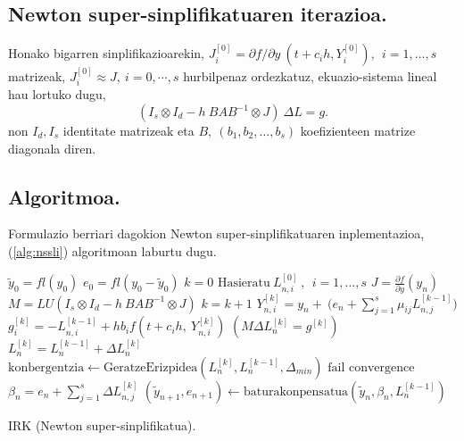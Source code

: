 \subsection*{Newton super-sinplifikatuaren iterazioa.}

Honako bigarren sinplifikazioarekin, $J_i^{[0]}=\partial f / \partial y \ (t+c_ih, Y_i^{[0]}), \ \  i=1,\dots,s$ matrizeak,  $J_i^{[0]} \approx J, \ i=0,\cdots,s$ hurbilpenaz ordezkatuz, ekuazio-sistema lineal hau lortuko dugu,
\begin{equation}
\label{eq:nsseq2}
(I_s \otimes I_d - h \ BAB^{-1} \otimes J) \ \Delta L = g. 
\end{equation}
non $I_d, I_s$ identitate matrizeak eta $B, \ (b_1,b_2,\dots,b_s)$ koefizienteen matrize diagonala diren.  

\subsection*{Algoritmoa.}

Formulazio berriari dagokion Newton super-sinplifikatuaren inplementazioa, (\ref{alg:nssli}) algoritmoan laburtu dugu.

\begin{algorithm}[H]
 \BlankLine
  $\tilde{y}_0=fl(y_0)$\;
  $e_0=fl(y_0-\tilde{y}_0)$\;
  {
   \BlankLine
   $k=0$\;
   $\text{Hasieratu} \ L_{n,i}^{[0]} \ , \ \ i=1,\dots,s $\;
   \BlankLine
   $J=\frac{\partial f}{\partial y}(y_n) $\; 
   $M=LU(I_s \otimes I_d - h \ BAB^{-1} \otimes J)$\;
   \BlankLine
   {
    \BlankLine 
    $k=k+1$\;
    $Y_{n,i}^{[k]}=y_{n} + \ \big(e_n+\sum\limits_{j=1}^{s} \mu_{ij} L_{n,j}^{[k-1]}\big)  $\;
    $g_i^{[k]}=-L_{n,i}^{[k-1]}+h b_i f(t+c_ih,\ Y_{n,i}^{[k]})$\;
     $(M \Delta L_n^{[k]}=g^{[k]})$\;
    $L_n^{[k]}=L_n^{[k-1]}+\Delta L_n^{[k]}$\;
    $\text{konbergentzia} \leftarrow \text{GeratzeErizpidea}(L_n^{[k]},L_n^{[k-1]},\Delta_{min}) $\;
   }
   \BlankLine
   {
    {$\text{fail convergence}$\;}
   }
   $\beta_{n}={e}_{n} + \sum\limits_{j=1}^{s}\Delta L_{n,j}^{[k]}$\;
   $(\tilde y_{n+1}, e_{n+1})\leftarrow \text{baturakonpensatua}(\tilde y_{n},\beta_{n},L_{n}^{[k-1]})$\;
 }
 \caption{IRK (Newton super-sinplifikatua).}
 \label{alg:nssli}
\end{algorithm}



